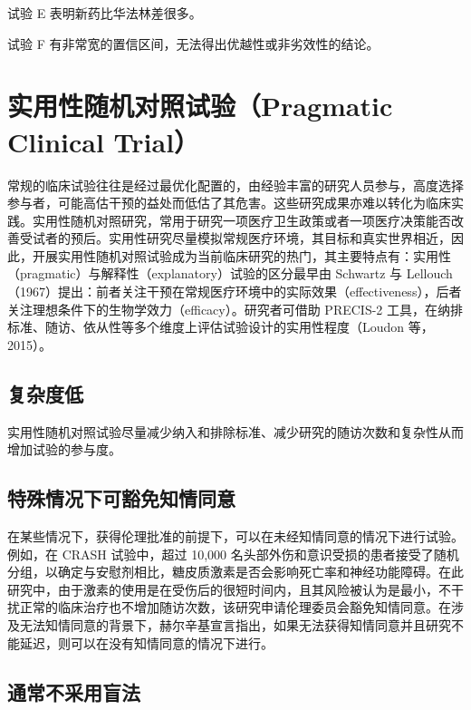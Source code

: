 \documentclass[
  chinese-hans,
  letterpaper,
  DIV=11,
  numbers=noendperiod]{scrreprt}
\begin{document}
试验 E 表明新药比华法林差很多。

试验 F 有非常宽的置信区间，无法得出优越性或非劣效性的结论。

\section{实用性随机对照试验（Pragmatic Clinical
Trial）}\label{ux5b9eux7528ux6027ux968fux673aux5bf9ux7167ux8bd5ux9a8cpragmatic-clinical-trial}

常规的临床试验往往是经过最优化配置的，由经验丰富的研究人员参与，高度选择参与者，可能高估干预的益处而低估了其危害。这些研究成果亦难以转化为临床实践。实用性随机对照研究，常用于研究一项医疗卫生政策或者一项医疗决策能否改善受试者的预后。实用性研究尽量模拟常规医疗环境，其目标和真实世界相近，因此，开展实用性随机对照试验成为当前临床研究的热门，其主要特点有：实用性（pragmatic）与解释性（explanatory）试验的区分最早由
Schwartz 与
Lellouch（1967）提出：前者关注干预在常规医疗环境中的实际效果（effectiveness），后者关注理想条件下的生物学效力（efficacy）。研究者可借助
PRECIS-2
工具，在纳排标准、随访、依从性等多个维度上评估试验设计的实用性程度（Loudon
等，2015）。

\subsection{复杂度低}\label{ux590dux6742ux5ea6ux4f4e}

实用性随机对照试验尽量减少纳入和排除标准、减少研究的随访次数和复杂性从而增加试验的参与度。

\subsection{特殊情况下可豁免知情同意}\label{ux7279ux6b8aux60c5ux51b5ux4e0bux53efux8c41ux514dux77e5ux60c5ux540cux610f}

在某些情况下，获得伦理批准的前提下，可以在未经知情同意的情况下进行试验。例如，在
CRASH 试验中，超过 10,000
名头部外伤和意识受损的患者接受了随机分组，以确定与安慰剂相比，糖皮质激素是否会影响死亡率和神经功能障碍。在此研究中，由于激素的使用是在受伤后的很短时间内，且其风险被认为是最小，不干扰正常的临床治疗也不增加随访次数，该研究申请伦理委员会豁免知情同意。在涉及无法知情同意的背景下，赫尔辛基宣言指出，如果无法获得知情同意并且研究不能延迟，则可以在没有知情同意的情况下进行。

\subsection{通常不采用盲法}\label{ux901aux5e38ux4e0dux91c7ux7528ux76f2ux6cd5}
\end{document}

